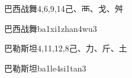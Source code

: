 \begin{Entry}{巴西战舞}{4,6,9,14}{⼰、⾑、⼽、⾇}
  \begin{Phonetics}{巴西战舞}{ba1xi1zhan4wu3}
  \end{Phonetics}
\end{Entry}

\begin{Entry}{巴勒斯坦}{4,11,12,8}{⼰、⼒、⽄、⼟}
  \begin{Phonetics}{巴勒斯坦}{ba1le4si1tan3}
  \end{Phonetics}
\end{Entry}


